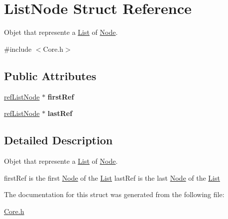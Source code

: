 \hypertarget{structListNode}{\section{List\-Node Struct Reference}
\label{structListNode}
}


Objet that represente a \hyperlink{structList}{List} of \hyperlink{structNode}{Node}.  




{\ttfamily \#include $<$Core.\-h$>$}

\subsection*{Public Attributes}
\begin{DoxyCompactItemize}
\item 
\hypertarget{structListNode_a4264652974ed589c9ed582f3a4824601}{\hyperlink{structrefListNode}{ref\-List\-Node} $\ast$ {\bfseries first\-Ref}}\label{structListNode_a4264652974ed589c9ed582f3a4824601}

\item 
\hypertarget{structListNode_a014039589e69b8826362231855e4d96d}{\hyperlink{structrefListNode}{ref\-List\-Node} $\ast$ {\bfseries last\-Ref}}\label{structListNode_a014039589e69b8826362231855e4d96d}

\end{DoxyCompactItemize}


\subsection{Detailed Description}
Objet that represente a \hyperlink{structList}{List} of \hyperlink{structNode}{Node}. 

first\-Ref is the first \hyperlink{structNode}{Node} of the \hyperlink{structList}{List} last\-Ref is the last \hyperlink{structNode}{Node} of the \hyperlink{structList}{List} 

The documentation for this struct was generated from the following file\-:\begin{DoxyCompactItemize}
\item 
\hyperlink{Core_8h}{Core.\-h}\end{DoxyCompactItemize}
